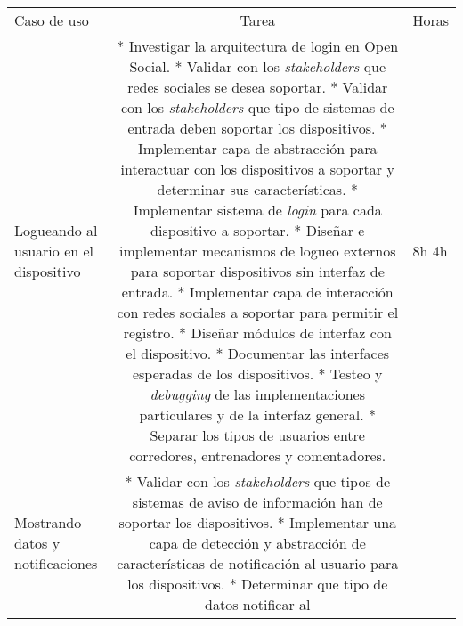 \begin{longtable}[c]{@{}lcl@{}}
\hline\noalign{\medskip}
\begin{minipage}[b]{0.28\columnwidth}\raggedright
Caso de uso
\end{minipage} & \begin{minipage}[b]{0.62\columnwidth}\centering
Tarea
\end{minipage} & \begin{minipage}[b]{0.10\columnwidth}\raggedright
Horas
\end{minipage}
\\\noalign{\medskip}
\hline\noalign{\medskip}
\begin{minipage}[t]{0.28\columnwidth}\raggedright
Logueando al usuario en el dispositivo
\end{minipage} & \begin{minipage}[t]{0.62\columnwidth}\centering
* Investigar la arquitectura de login en Open Social. * Validar con los
\emph{stakeholders} que redes sociales se desea soportar. * Validar con
los \emph{stakeholders} que tipo de sistemas de entrada deben soportar
los dispositivos. * Implementar capa de abstracción para interactuar con
los dispositivos a soportar y determinar sus características. *
Implementar sistema de \emph{login} para cada dispositivo a soportar. *
Diseñar e implementar mecanismos de logueo externos para soportar
dispositivos sin interfaz de entrada. * Implementar capa de interacción
con redes sociales a soportar para permitir el registro. * Diseñar
módulos de interfaz con el dispositivo. * Documentar las interfaces
esperadas de los dispositivos. * Testeo y \emph{debugging} de las
implementaciones particulares y de la interfaz general. * Separar los
tipos de usuarios entre corredores, entrenadores y comentadores.
\end{minipage} & \begin{minipage}[t]{0.10\columnwidth}\raggedright
8h 4h
\end{minipage}
\\\noalign{\medskip}
\begin{minipage}[t]{0.28\columnwidth}\raggedright
Mostrando datos y notificaciones
\end{minipage} & \begin{minipage}[t]{0.62\columnwidth}\centering
* Validar con los \emph{stakeholders} que tipos de sistemas de aviso de
información han de soportar los dispositivos. * Implementar una capa de
detección y abstracción de características de notificación al usuario
para los dispositivos. * Determinar que tipo de datos notificar al

\end{minipage}
\end{longtable}
